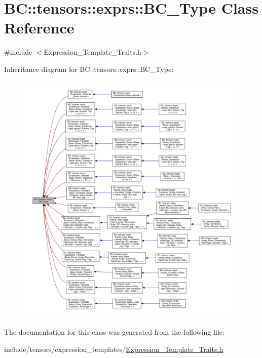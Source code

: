 \hypertarget{classBC_1_1tensors_1_1exprs_1_1BC__Type}{}\section{BC\+:\+:tensors\+:\+:exprs\+:\+:B\+C\+\_\+\+Type Class Reference}
\label{classBC_1_1tensors_1_1exprs_1_1BC__Type}


{\ttfamily \#include $<$Expression\+\_\+\+Template\+\_\+\+Traits.\+h$>$}



Inheritance diagram for BC\+:\+:tensors\+:\+:exprs\+:\+:B\+C\+\_\+\+Type\+:
\nopagebreak
\begin{figure}[H]
\begin{center}
\leavevmode
\includegraphics[width=350pt]{classBC_1_1tensors_1_1exprs_1_1BC__Type__inherit__graph}
\end{center}
\end{figure}


The documentation for this class was generated from the following file\+:\begin{DoxyCompactItemize}
\item 
include/tensors/expression\+\_\+templates/\hyperlink{Expression__Template__Traits_8h}{Expression\+\_\+\+Template\+\_\+\+Traits.\+h}\end{DoxyCompactItemize}

